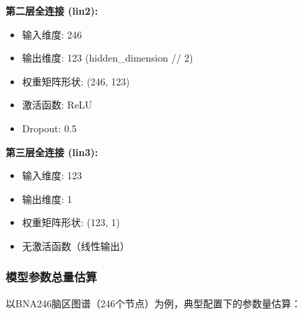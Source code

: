 \textbf{第二层全连接 (lin2):}
\begin{itemize}
    \item 输入维度: 246
    \item 输出维度: 123 (hidden\_dimension // 2)
    \item 权重矩阵形状: (246, 123)
    \item 激活函数: ReLU
    \item Dropout: 0.5
\end{itemize}

\textbf{第三层全连接 (lin3):}
\begin{itemize}
    \item 输入维度: 123
    \item 输出维度: 1
    \item 权重矩阵形状: (123, 1)
    \item 无激活函数（线性输出）
\end{itemize}

\subsubsection{模型参数总量估算}

以BNA246脑区图谱（246个节点）为例，典型配置下的参数量估算：

